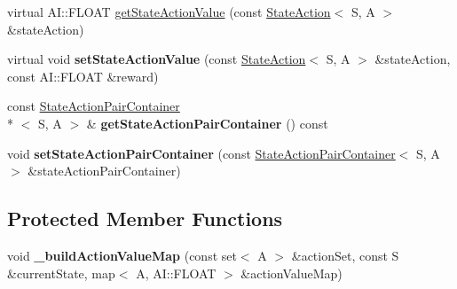\begin{DoxyCompactItemize}
\item 
virtual A\-I\-::\-F\-L\-O\-A\-T \hyperlink{classAI_1_1Algorithm_1_1ReinforcementLearning_ad078677d92b33df4ae7d3c78e040b766}{get\-State\-Action\-Value} (const \hyperlink{classAI_1_1StateAction}{State\-Action}$<$ S, A $>$ \&state\-Action)
\item 
\hypertarget{classAI_1_1Algorithm_1_1ReinforcementLearning_a5d576410235e5099f153d21f20a8e5af}{virtual void {\bfseries set\-State\-Action\-Value} (const \hyperlink{classAI_1_1StateAction}{State\-Action}$<$ S, A $>$ \&state\-Action, const A\-I\-::\-F\-L\-O\-A\-T \&reward)}\label{classAI_1_1Algorithm_1_1ReinforcementLearning_a5d576410235e5099f153d21f20a8e5af}

\item 
\hypertarget{classAI_1_1Algorithm_1_1ReinforcementLearning_a6b5fe1be9629bf5574d32ae4eeec33f5}{const \hyperlink{classAI_1_1StateActionPairContainer}{State\-Action\-Pair\-Container}\\*
$<$ S, A $>$ \& {\bfseries get\-State\-Action\-Pair\-Container} () const }\label{classAI_1_1Algorithm_1_1ReinforcementLearning_a6b5fe1be9629bf5574d32ae4eeec33f5}

\item 
\hypertarget{classAI_1_1Algorithm_1_1ReinforcementLearning_ad889f5f5949cac39d121f57e3027ad0c}{void {\bfseries set\-State\-Action\-Pair\-Container} (const \hyperlink{classAI_1_1StateActionPairContainer}{State\-Action\-Pair\-Container}$<$ S, A $>$ \&state\-Action\-Pair\-Container)}\label{classAI_1_1Algorithm_1_1ReinforcementLearning_ad889f5f5949cac39d121f57e3027ad0c}

\end{DoxyCompactItemize}
\subsection*{Protected Member Functions}
\begin{DoxyCompactItemize}
\item 
\hypertarget{classAI_1_1Algorithm_1_1ReinforcementLearning_a3efc892a8b36ee3f878c86d15f30883f}{void {\bfseries \-\_\-build\-Action\-Value\-Map} (const set$<$ A $>$ \&action\-Set, const S \&current\-State, map$<$ A, A\-I\-::\-F\-L\-O\-A\-T $>$ \&action\-Value\-Map)}\label{classAI_1_1Algorithm_1_1ReinforcementLearning_a3efc892a8b36ee3f878c86d15f30883f}

\end{DoxyCompactItemize}

